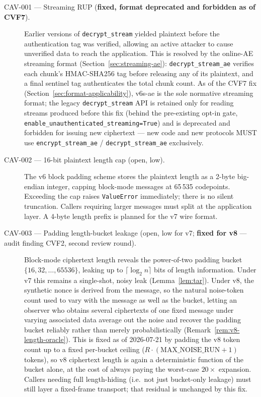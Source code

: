 \documentclass[11pt,a4paper]{article}
\begin{document}
\begin{description}
  \item[CAV-001 — Streaming RUP (\textbf{fixed, format deprecated and
        forbidden as of CVF7}).] Earlier versions of
        \texttt{decrypt\_stream} yielded plaintext before the authentication
        tag was verified, allowing an active attacker to cause unverified data
        to reach the application.  This is resolved by the online-AE streaming
        format (Section~\ref{sec:streaming-ae}):
        \texttt{decrypt\_stream\_ae} verifies each chunk's HMAC-SHA256 tag
        before releasing any of its plaintext, and a final sentinel tag
        authenticates the total chunk count.  As of the CVF7 fix
        (Section~\ref{sec:format-applicability}), v6s-ae is the sole
        normative streaming format; the legacy \texttt{decrypt\_stream} API
        is retained only for reading streams produced before this fix
        (behind the pre-existing opt-in gate,
        \texttt{enable\_unauthenticated\_streaming=True}) and is deprecated
        and forbidden for issuing new ciphertext — new code and new
        protocols MUST use \texttt{encrypt\_stream\_ae} /
        \texttt{decrypt\_stream\_ae} exclusively.

  \item[CAV-002 — 16-bit plaintext length cap (open, low).] The v6 block
        padding scheme stores the plaintext length as a 2-byte big-endian
        integer, capping block-mode messages at 65\,535 codepoints.  Exceeding
        the cap raises \texttt{ValueError} immediately; there is no silent
        truncation.  Callers requiring larger messages must split at the
        application layer.  A 4-byte length prefix is planned for the v7 wire
        format.

  \item[CAV-003 — Padding length-bucket leakage (open, low for v7;
        \textbf{fixed for v8} — audit finding CVF2, second review round).]
        Block-mode ciphertext length reveals the power-of-two padding
        bucket $\{16, 32, \ldots, 65536\}$, leaking up to
        $\lceil\log_2 n\rceil$ bits of length information. Under v7 this
        remains a single-shot, noisy leak (Lemma~\ref{lem:tar}). Under v8,
        the synthetic nonce is derived from the message, so the natural
        noise-token count used to vary with the message as well as the
        bucket, letting an observer who obtains several ciphertexts of one
        fixed message under varying associated data average out the noise
        and recover the padding bucket reliably rather than merely
        probabilistically (Remark~\ref{rem:v8-length-oracle}). This is
        fixed as of 2026-07-21 by padding the v8 token count up to a fixed
        per-bucket ceiling ($R\cdot(\mathrm{MAX\_NOISE\_RUN}+1)$ tokens),
        so v8 ciphertext length is again a deterministic function of the
        bucket alone, at the cost of always paying the worst-case
        $20\times$ expansion. Callers needing full length-hiding (i.e.\ not
        just bucket-only leakage) must still layer a fixed-frame
        transport; that residual is unchanged by this fix.


\end{description}
\end{document}
